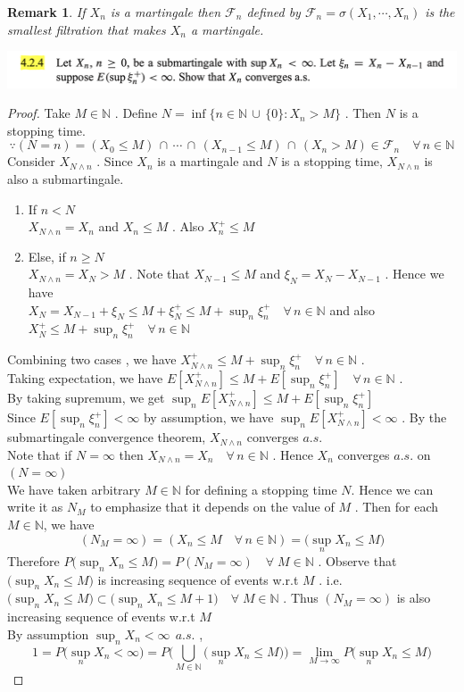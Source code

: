 \documentclass[12pt, A4]{article}
\newtheorem*{remark}{Remark}
\newcommand{\N}{\mathbb{N}}
\newcommand{\F}{\mathcal{F}}
\newcommand{\union}{\,\cup\,}
\newcommand{\intersect}{\,\cap\,}
\newcommand{\foranyn}{\quad \forall \, n\in \N}
\begin{document}
\begin{remark}
    If $X_n$ is a martingale then  $\F_n$ defined by $\F_n=\sigma(X_1, \cdots, X_n)$ is the smallest filtration that makes $X_n$ a martingale.
\end{remark}

\vspace{1cm}
\includegraphics[width=17cm]{Exer4.2.4.png}

\begin{proof}
    Take $M\in \N$ . Define $N=\inf\{n\in \N\union \{0\} : X_n>M \}$ . Then $N$ is a stopping time.
    $$\because (N=n)=(X_0\leq M)\intersect \cdots \intersect (X_{n-1}\leq M)\intersect (X_n>M)\in \F_n \foranyn$$
    Consider $X_{N\wedge n}$ . Since $X_n$ is a martingale and $N$ is a stopping time, $X_{N\wedge n}$ is also a submartingale. \\
    \begin{enumerate}
        \item If $n<N$ \\ $X_{N\wedge n}=X_n$ and $X_n\leq M$ . Also $X_n^+\leq M$
        \item Else, if $n\geq N$ \\ $X_{N\wedge n}=X_N>M$ . Note that $X_{N-1}\leq M$ and $\xi_N=X_N-X_{N-1}$ . Hence we have \\ $X_N=X_{N-1}+\xi_N \leq M+\xi_N^+\leq M+\sup_n \xi_n^+\foranyn$ and also $X_N^+\leq M+\sup_n \xi_n^+\foranyn$
    \end{enumerate}
    Combining two cases , we have $X_{N\wedge n}^+\leq M+\sup_n \xi_n^+\foranyn$ . \\Taking expectation, we have $E[X_{N\wedge n}^+]\leq M+E[\sup_n \xi_n^+]\foranyn$ . \\By taking supremum, we get $\sup_n E[X_{N\wedge n}^+]\leq M+E[\sup_n \xi_n^+]$ \\ Since $E[\sup_n \xi_n^+]<\infty$ by assumption, we have $\sup_n E[X_{N\wedge n}^+]<\infty$ . By the submartingale convergence theorem, $X_{N\wedge n}$ converges $a.s.$ \\ Note that if $N=\infty$ then $X_{N\wedge n}=X_n\foranyn$ . Hence $X_n$ converges $a.s.$ on $(N=\infty)$ \\ We have taken arbitrary $M\in \N$ for defining a stopping time $N$. Hence we can write it as $N_M$ to emphasize that it depends on the value of $M$ . Then for each $M\in \N$, we have $$(N_M=\infty) = (X_n\leq M\foranyn)= \Big(\sup_{n}X_n\leq M\Big) $$ Therefore $P\Big(\sup_{n}X_n\leq M\Big)= P(N_M=\infty) \quad \forall \; M\in \N$ . Observe that $\Big(\sup_{n}X_n\leq M\Big)$ is increasing sequence of events w.r.t $M$ . i.e.  $\Big(\sup_{n}X_n\leq M\Big)\subset \Big(\sup_{n}X_n\leq M+1\Big)\quad \forall \; M\in \N$ . Thus $(N_M=\infty)$ is also increasing sequence of events w.r.t $M$ \\ By assumption $\sup_n X_n<\infty\;\, a.s.$ , $$1=P\Big(\sup_{n}X_n<\infty \Big)=P\Big(\bigcup_{M\in \N}\big(\sup_{n}X_n\leq M \big)\Big)=\lim_{M\rightarrow \infty} P\Big(\sup_{n}X_n\leq M\Big)$$

\end{proof}
\end{document}

